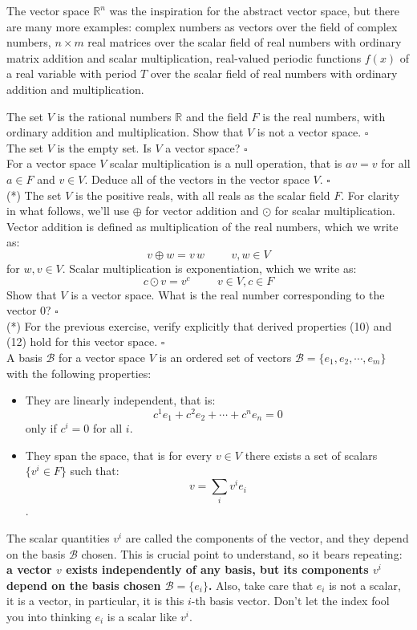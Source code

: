 \documentclass[12pt]{article}
\begin{document}
\noindent
The vector space ${\mathbb R}^n$ was the inspiration for the abstract
vector space, but there are many more examples: complex numbers as
vectors over the field of complex numbers, $n \times m$ real matrices
over the scalar field of real numbers with ordinary matrix addition
and scalar multiplication, real-valued periodic functions $f(x)$ of a
real variable with period $T$ over the scalar field of real numbers
with ordinary addition and multiplication.

\exercise The set $V$ is the rational numbers $\mathbb{R}$ and the
field $F$ is the real numbers, with ordinary addition and
multiplication.  Show that $V$ is not a vector space. $\square$
\\[3pt]

\exercise The set $V$ is the empty set.  Is $V$ a vector space?
$\square$ \\[3pt]

\exercise For a vector space $V$ scalar multiplication is a null
operation, that is $a v = v$ for all $a \in F$ and $v \in V$.  Deduce
all of the vectors in the vector space $V$.  $\square$ \\[3pt]

\exercise (*) The set $V$ is the positive reals, with all reals as the
scalar field $F$.  For clarity in what follows, we'll use $\oplus$ for
vector addition and $\odot$ for scalar multiplication.  Vector
addition is defined as multiplication of the real numbers, which we
write as:
$$v \oplus w = v \, w  \hspace{1cm} v,w \in V$$
for $w,v \in V$.  Scalar multiplication is exponentiation, which we write as:
$$c \odot v = v^c  \hspace{1cm} v \in V, c \in F$$
Show that $V$ is a vector space.  What is the real number corresponding to the vector $0$?
 $\square$ \\[3pt]

\exercise (*) For the previous exercise, verify explicitly that
derived properties (10) and (12) hold for this vector space.
$\square$ \\[3pt]

\noindent
A basis $\mathcal{B}$ for a vector space $V$ is an ordered set of
vectors $\mathcal{B} = \{e_1, e_2, \cdots, e_m\}$ with the following
properties:
\begin{itemize}
\item They are linearly independent, that is:
$$c^1 e_1 + c^2 e_2 + \cdots + c^n e_n = 0$$
only if $c^i=0$ for all $i$.
\item They span the space, that is for every $v \in V$ there exists a set of scalars $\{v^i \in F\}$ such that:
$$v = \sum_i v^i e_i$$.
\end{itemize}
The scalar quantities $v^i$ are called the components of the vector,
and they depend on the basis $\mathcal{B}$ chosen.  This is crucial
point to understand, so it bears repeating: {\bf a vector $v$ exists
  independently of any basis, but its components $v^i$ depend on the
  basis chosen $\mathcal{B} = \{e_i\}$.}  Also, take care that $e_i$
is not a scalar, it is a vector, in particular, it is this $i$-th
basis vector.  Don't let the index fool you into thinking $e_i$ is a
scalar like $v^i$.\\
\end{document}
